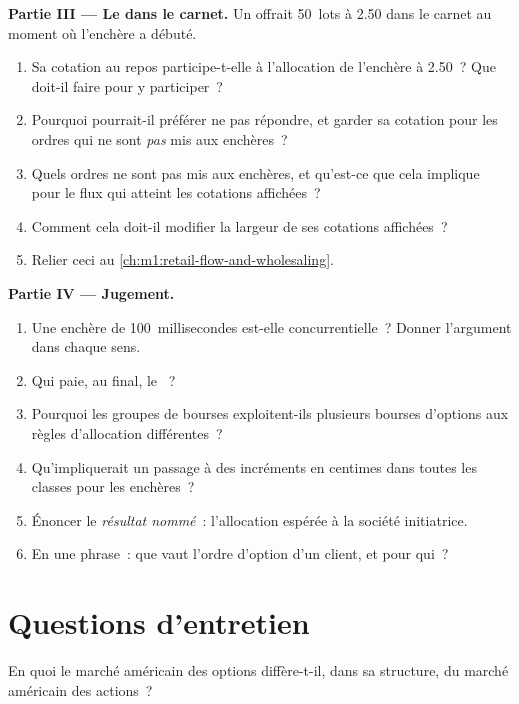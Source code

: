 \begin{problem}
\medskip\noindent\textbf{Partie III --- Le  dans le carnet.}
Un  offrait 50~lots à 2.50 dans le carnet au moment où
l'enchère a débuté.
\begin{enumerate}[resume]
\item Sa cotation au repos participe-t-elle à l'allocation de l'enchère à 2.50~? Que doit-il faire
pour y participer~?
\item Pourquoi pourrait-il préférer ne pas répondre, et garder sa cotation pour les ordres
qui ne sont \emph{pas} mis aux enchères~?
\item Quels ordres ne sont pas mis aux enchères, et qu'est-ce que cela implique pour le flux
qui atteint les cotations affichées~?
\item Comment cela doit-il modifier la largeur de ses cotations affichées~?
\item Relier ceci au \cref{ch:m1:retail-flow-and-wholesaling}.
\end{enumerate}

\medskip\noindent\textbf{Partie IV --- Jugement.}
\begin{enumerate}[resume]
\item Une enchère de 100~millisecondes est-elle concurrentielle~? Donner l'argument dans
chaque sens.
\item Qui paie, au final, le ~?
\item Pourquoi les groupes de bourses exploitent-ils plusieurs bourses d'options
aux règles d'allocation différentes~?
\item Qu'impliquerait un passage à des incréments en centimes dans toutes les classes pour les enchères~?
\item Énoncer le \emph{résultat nommé}~: l'allocation espérée à la société
initiatrice.
\item En une phrase~: que vaut l'ordre d'option d'un client, et pour qui~?
\end{enumerate}
\end{problem}

\section{Questions d'entretien}

\begin{interviewq}\label{iq:m1:options-market-structure:1}
En quoi le marché américain des options diffère-t-il, dans sa structure, du
marché américain des actions~?
\end{interviewq}

